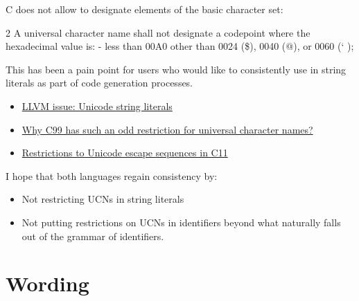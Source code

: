 \documentclass{wg21}
\begin{document}
C does not allow  to designate elements of the basic character set:

\begin{quoteblock}
2 A universal character name shall not designate a codepoint where the hexadecimal value is:
- less than 00A0 other than 0024 (\$), 0040 (@), or 0060 (` );
\end{quoteblock}

This has been a pain point for users who would like to consistently use  in string literals as
part of code generation processes.

\begin{itemize}
\item \href{https://github.com/llvm/llvm-project/issues/36392}{LLVM issue: Unicode string literals}
\item \href{https://stackoverflow.com/questions/20158472/why-c99-has-such-an-odd-restriction-for-universal-character-names}{Why C99 has such an odd restriction for universal character names?}
\item \href{https://stackoverflow.com/questions/62759943/restrictions-to-unicode-escape-sequences-in-c11}{Restrictions to Unicode escape sequences in C11}
\end{itemize}

I hope that both languages regain consistency by:
\begin{itemize}
\item Not restricting UCNs in string literals
\item Not putting restrictions on UCNs in identifiers beyond what naturally falls out of the grammar of identifiers.
\end{itemize}

\section{Wording}

%
%
%
\end{document}
